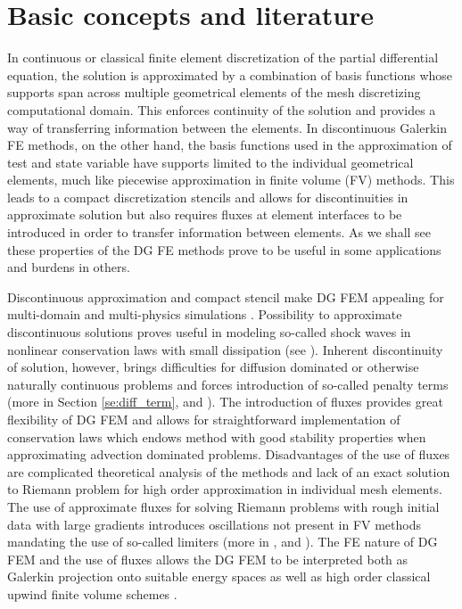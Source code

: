 \section{Basic concepts and literature}
In continuous or classical finite element discretization of the partial 
differential equation, the solution is approximated by a combination of basis 
functions whose supports span across multiple geometrical elements of the mesh 
discretizing computational domain. This enforces continuity of the solution 
and provides a way of transferring information between the elements. In 
discontinuous Galerkin FE methods, on the other hand, the basis functions used 
in the approximation of test and state variable have supports limited to the 
individual geometrical elements, much like piecewise approximation in finite 
volume (FV) methods. This leads to a compact discretization stencils and 
allows for discontinuities in approximate solution but also requires fluxes at 
element interfaces to be introduced in order to transfer information between 
elements. As we shall see these properties of the DG FE methods prove to be 
useful in some applications and burdens in others.

Discontinuous approximation and compact stencil make DG FEM appealing for 
multi-domain and multi-physics simulations \cite{DiPietro2012}. Possibility to 
approximate discontinuous solutions proves useful in modeling so-called shock 
waves in nonlinear conservation laws with small dissipation \cite{Kucera}(see 
). Inherent discontinuity of solution, however, brings 
difficulties for diffusion dominated or otherwise naturally continuous 
problems and forces introduction of so-called penalty terms (more in Section 
\ref{se:diff_term}, \cite{Antonietti2013} and \cite{Kucera}). The introduction 
of fluxes provides great flexibility of DG FEM and allows for straightforward 
implementation of conservation laws which endows method with good stability 
properties when approximating advection dominated problems. Disadvantages of 
the use of fluxes are complicated theoretical analysis of the methods and lack 
of an exact solution to Riemann problem for high order approximation in 
individual mesh elements. The use of approximate fluxes for solving Riemann 
problems with rough initial data with large gradients introduces oscillations 
not present in FV methods mandating the use of so-called limiters (more in 
, \cite[Sec. 3.2.4]{DiPietro2012} and 
\cite{Krivodonova2007}). The FE nature of DG FEM and the use of fluxes allows 
the DG FEM to be interpreted both as Galerkin projection onto suitable energy 
spaces as well as high order classical upwind finite volume schemes 
\cite{Georgoulis2011}. 

